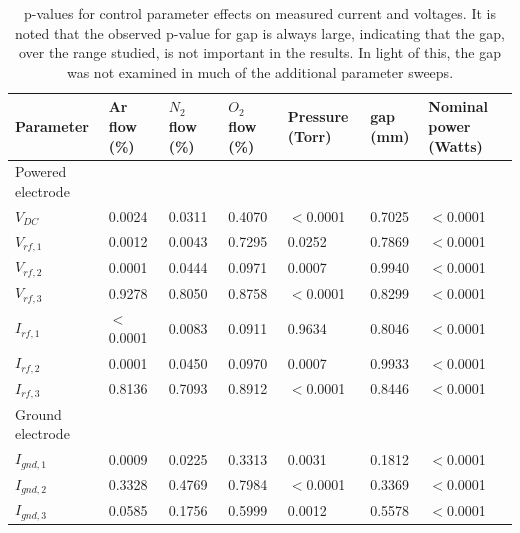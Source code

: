 \documentclass[12pt]{iopart}
\begin{document}
\begin{table}[]
    \centering
\begin{tabular}{ |p{3.5cm}|p{1.5cm}|p{1.5cm}|p{1.5cm}|p{1.5cm}|p{1.5cm}|p{1.5cm}| }
        \hline
        Parameter & Ar flow (\%) & $N_2$ flow (\%) & $O_2$ flow (\%) & Pressure (Torr) & gap (mm) & Nominal power (Watts) \\
        \hline
        Powered electrode &&&&&&\\
        \hline
        $V_{DC}$ & 0.0024 & 0.0311 & 0.4070 & $<$0.0001 & 0.7025 & $<$0.0001\\
        $V_{rf,1}$ & 0.0012 & 0.0043 & 0.7295 & 0.0252 & 0.7869 & $<$0.0001\\
        $V_{rf,2}$ & 0.0001 & 0.0444 & 0.0971 & 0.0007 & 0.9940 & $<$0.0001\\
        $V_{rf,3}$ & 0.9278 & 0.8050 & 0.8758 & $<$0.0001 & 0.8299 & $<$0.0001\\
        $I_{rf,1}$ &  $<$0.0001 & 0.0083 & 0.0911 & 0.9634 & 0.8046 & $<$0.0001\\
        $I_{rf,2}$ & 0.0001 & 0.0450 & 0.0970 & 0.0007 & 0.9933 & $<$0.0001\\
        $I_{rf,3}$ & 0.8136 & 0.7093 & 0.8912 & $<$0.0001 & 0.8446 & $<$0.0001\\
        \hline
        Ground electrode &&&&&& \\
        \hline
        $I_{gnd,1}$ & 0.0009 & 0.0225 & 0.3313 & 0.0031 & 0.1812 & $<$0.0001\\
        $I_{gnd,2}$ & 0.3328 & 0.4769 & 0.7984 & $<$0.0001 & 0.3369 & $<$0.0001\\
        $I_{gnd,3}$ & 0.0585 & 0.1756 & 0.5999 & 0.0012 & 0.5578 & $<$0.0001\\
        \hline
    \end{tabular}
    \caption{p-values for control parameter effects on measured current and voltages.  It is noted that the observed p-value for gap is always large, indicating that the gap, over the range studied, is not important in the results. In light of this, the gap was not examined in much of the additional parameter sweeps.}
    \label{tab:DOE_Results}
\end{table}
\end{document}
